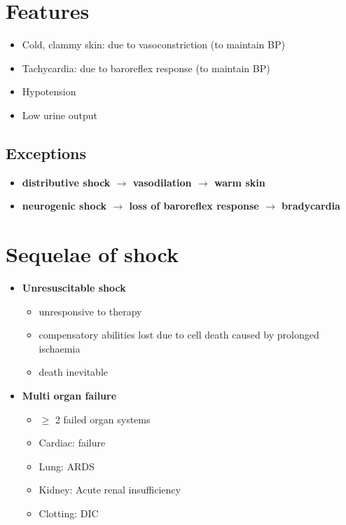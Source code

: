 \documentclass[
  14pt,
]{memoir}
\providecommand{\tightlist}{%
  \setlength{\itemsep}{0pt}\setlength{\parskip}{0pt}}
\begin{document}
\hypertarget{features}{%
\section{Features}\label{features}}

\begin{itemize}
\tightlist
\item
  Cold, clammy skin: due to vasoconstriction (to maintain BP)
\item
  Tachycardia: due to baroreflex response (to maintain BP)
\item
  Hypotension
\item
  Low urine output
\end{itemize}

\hypertarget{exceptions}{%
\subsection{Exceptions}\label{exceptions}}

\begin{itemize}
\tightlist
\item
  \textbf{distributive shock \(\rightarrow\) vasodilation
  \(\rightarrow\) warm skin}
\item
  \textbf{neurogenic shock \(\rightarrow\) loss of baroreflex response
  \(\rightarrow\) bradycardia}
\end{itemize}

\hypertarget{sequelae-of-shock}{%
\section{Sequelae of shock}\label{sequelae-of-shock}}

\begin{itemize}
\tightlist
\item
  \textbf{Unresuscitable shock}

  \begin{itemize}
  \tightlist
  \item
    unresponsive to therapy
  \item
    compensatory abilities lost due to cell death caused by prolonged
    ischaemia
  \item
    death inevitable
  \end{itemize}
\item
  \textbf{Multi organ failure}

  \begin{itemize}
  \tightlist
  \item
    \(\ge\) 2 failed organ systems
  \item
    Cardiac: failure
  \item
    Lung: ARDS
  \item
    Kidney: Acute renal insufficiency
  \item
    Clotting: DIC
  \end{itemize}
\end{itemize}
\end{document}
